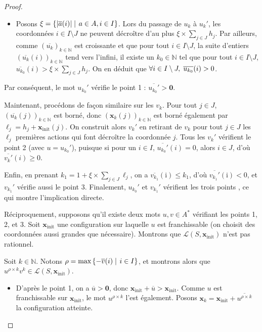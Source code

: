 \documentclass[a4paper,final]{article}
\theoremstyle{definition}
\let\leq\leqslant
\let\geq\geqslant
\newcommand{\set}[2]{\left\{#1\mathrel{\left|\vphantom{#1}\vphantom{#2}\right.}#2\right\}}
\newcommand{\abs}[1]{\ensuremath{\displaystyle\left\lvert #1 \right\rvert}}
\newcommand{\N}{\ensuremath{\mathbb{N}}}
\newcommand{\lang}{\ensuremath{\mathcal{L}}}
\newcommand{\vect}[1]{\ensuremath{\mathbf{#1}}}
\newcommand{\xinit}{\ensuremath{\vect{x}_\text{init}}}
\newcommand{\valeur}[1]{\ensuremath{\overline{#1}}}
\begin{document}
\begin{proof}
\begin{itemize}
    \item Posons $\xi = \set{\abs{\valeur{a}(i)}} {a\in A,i\in I}$.
    Lors du passage de $u_k$ à $u_k'$, les coordonnées $i\in I\setminus J$ ne peuvent décroître d'au plus $\xi \times \sum_{j\in J} h_j$.
    Par ailleurs, comme $(\valeur{u_k})_{k\in\N}$ est croissante et que pour tout $i\in I\setminus J$, la suite d'entiers $(\valeur{u_k}(i))_{k\in\N}$ tend vers l'infini, 
    il existe un $k_0\in\N$ tel que pour tout $i\in I\setminus J$, $\valeur{u_{k_0}}(i) > \xi \times \sum_{j\in J} h_j$.
    On en déduit que $\forall i\in I\setminus J, \hspace{1mm} \valeur{u_{k_0}}(i) > 0$.
\end{itemize}
Par conséquent, le mot $u_{k_0}'$ vérifie le point 1 %
: $\valeur{u_{k_0}'} > \vect{0}$.
\vspace{2mm}

Maintenant, procédons de façon similaire sur les $v_k$.
Pour tout $j\in J$, $(\valeur{u_k}(j))_{k\in\N}$ est borné, donc $(\vect{x}_k(j))_{k\in\N}$ est borné également par $\ell_j = h_j + \xinit(j)$.
On construit alors $v_k'$ en retirant de $v_k$ pour tout $j\in J$ les $\ell_j$ premières actions qui font décroître la coordonnée $j$.
Tous les $v_k'$ vérifient le point 2 (avec $u = u_{k_0}'$), puisque si pour un $i\in I$, $\valeur{u_{k_0}'}(i) = 0$, alors $i\in J$, d'où $\valeur{v_k'}(i) \geq 0$.

Enfin, en prenant $k_1 = 1 + \xi \times \sum_{j\in J} \ell_j$, on a $\valeur{v_{k_1}}(\mathrm{i}) \leq k_1$, d'où $\valeur{v_{k_1}'}(\mathrm{i}) < 0$, et $v_{k_1}'$ vérifie aussi le point 3.
Finalement, $u_{k_0}'$ et $v_{k_1}'$ vérifient les trois points %
, ce qui montre l'implication directe.
\vspace{5mm}

Réciproquement, supposons qu'il existe deux mots $u,v\in A^*$ vérifiant les points 1, 2, et 3.
Soit $\xinit$ une configuration sur laquelle $u$ est franchissable (on choisit des coordonnées aussi grandes que nécessaire).
Montrons que $\lang(S,\xinit)$ n'est pas rationnel.

Soit $k\in\N$.
Notons $\rho = \text{max}\set{-\valeur{v}(i)}{i\in I}$, 
et montrons alors que $u^{\rho\times k} v^k \in \lang(S,\xinit)$.

\begin{itemize}
    \item D'après le point 1, on a $\valeur{u} > \vect{0}$, donc $\xinit + \valeur{u} > \xinit$.
    Comme $u$ est franchissable sur $\xinit$, le mot $u^{\rho\times k}$ l'est également.
    Posons $\vect{x}_k = \xinit + \valeur{u^{\rho\times k}}$ la configuration atteinte.
    

\end{itemize}
\end{proof}
\end{document}
